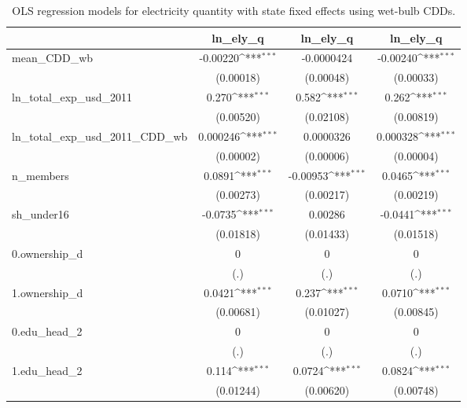 \begin{table}[htbp]\centering\footnotesize{
\def\sym#1{\ifmmode^{#1}\else\(^{#1}\)\fi}
\caption{OLS regression models for electricity quantity with state fixed effects using wet-bulb CDDs. \label{ely_reg_wb}}
\begin{tabular}{l*{3}{c}}
\hline\hline
            &\multicolumn{1}{c}{ln_ely_q}&\multicolumn{1}{c}{ln_ely_q}&\multicolumn{1}{c}{ln_ely_q}\\
\hline
mean_CDD_wb &    -0.00220\sym{***}&  -0.0000424         &    -0.00240\sym{***}\\
            &   (0.00018)         &   (0.00048)         &   (0.00033)         \\
ln_total_exp_usd_2011&       0.270\sym{***}&       0.582\sym{***}&       0.262\sym{***}\\
            &   (0.00520)         &   (0.02108)         &   (0.00819)         \\
ln_total_exp_usd_2011_CDD_wb&    0.000246\sym{***}&   0.0000326         &    0.000328\sym{***}\\
            &   (0.00002)         &   (0.00006)         &   (0.00004)         \\
n_members   &      0.0891\sym{***}&    -0.00953\sym{***}&      0.0465\sym{***}\\
            &   (0.00273)         &   (0.00217)         &   (0.00219)         \\
sh_under16  &     -0.0735\sym{***}&     0.00286         &     -0.0441\sym{***}\\
            &   (0.01818)         &   (0.01433)         &   (0.01518)         \\
0.ownership_d&           0         &           0         &           0         \\
            &         (.)         &         (.)         &         (.)         \\
1.ownership_d&      0.0421\sym{***}&       0.237\sym{***}&      0.0710\sym{***}\\
            &   (0.00681)         &   (0.01027)         &   (0.00845)         \\
0.edu_head_2&           0         &           0         &           0         \\
            &         (.)         &         (.)         &         (.)         \\
1.edu_head_2&       0.114\sym{***}&      0.0724\sym{***}&      0.0824\sym{***}\\
            &   (0.01244)         &   (0.00620)         &   (0.00748)         \\

\end{tabular}}
\end{table}
